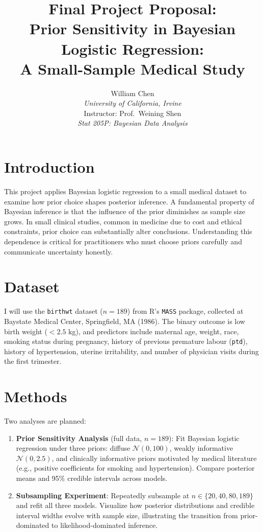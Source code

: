\documentclass[11pt]{article}
\title{\vspace{-1.5cm}\normalsize\textbf{Final Project Proposal:\\
Prior Sensitivity in Bayesian Logistic Regression:\\
A Small-Sample Medical Study}}
\author{
    William Chen\\
    \textit{University of California, Irvine}\\
    Instructor: Prof.\ Weining Shen\\
    \textit{Stat 205P: Bayesian Data Analysis}
}
\date{}
\begin{document}
\maketitle
\thispagestyle{empty}

\section*{Introduction}

This project applies Bayesian logistic regression to a small medical
dataset to examine how prior choice shapes posterior inference.
A fundamental property of Bayesian inference is that the influence
of the prior diminishes as sample size grows. In small clinical
studies, common in medicine due to cost and ethical constraints,
prior choice can substantially alter conclusions. Understanding
this dependence is critical for practitioners who must choose
priors carefully and communicate uncertainty honestly.

\section*{Dataset}

I will use the \texttt{birthwt} dataset ($n = 189$) from R's
\texttt{MASS} package, collected at Baystate Medical Center,
Springfield, MA (1986). The binary outcome is low birth weight
($< 2.5$ kg), and predictors include maternal age, weight, race,
smoking status during pregnancy, history of previous premature
labour (\texttt{ptd}), history of hypertension, uterine irritability,
and number of physician visits during the first trimester.

\section*{Methods}

Two analyses are planned:

\begin{enumerate}
    \item \textbf{Prior Sensitivity Analysis} (full data, $n = 189$):
    Fit Bayesian logistic regression under three priors: diffuse
    $\mathcal{N}(0, 100)$, weakly informative $\mathcal{N}(0, 2.5)$,
    and clinically informative priors motivated by medical literature
    (e.g., positive coefficients for smoking and hypertension).
    Compare posterior means and 95\% credible intervals across models.

    \item \textbf{Subsampling Experiment}: Repeatedly subsample at
    $n \in \{20, 40, 80, 189\}$ and refit all three models. Visualize
    how posterior distributions and credible interval widths evolve
    with sample size, illustrating the transition from
    prior-dominated to likelihood-dominated inference.
\end{enumerate}
\end{document}
